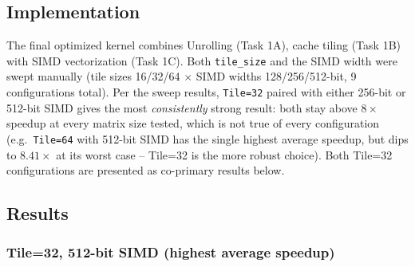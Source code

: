 \documentclass[11pt]{article}
\begin{document}
\subsection{Implementation}
The final optimized kernel combines Unrolling (Task 1A), cache tiling (Task 1B) with SIMD vectorization
(Task 1C). Both \texttt{tile\_size} and the SIMD width were swept manually
(tile sizes 16/32/64 $\times$ SIMD widths 128/256/512-bit, 9 configurations total).
Per the sweep results, \texttt{Tile=32} paired with either 256-bit or 512-bit SIMD gives
the most \emph{consistently} strong result: both stay above $8\times$ speedup at every
matrix size tested, which is not true of every configuration (e.g.\ \texttt{Tile=64} with
512-bit SIMD has the single highest average speedup, but dips to $8.41\times$ at its worst
case -- Tile=32 is the more robust choice). Both Tile=32 configurations are presented as
co-primary results below.

\subsection{Results}

\subsubsection*{Tile=32, 512-bit SIMD (highest average speedup)}
\begin{table}[H]
  \centering
  \caption{Tile Size = 32, 512-bit SIMD}
  \label{tab:optimized_tileSize32SIMDbits512}
\end{table}
\end{document}
